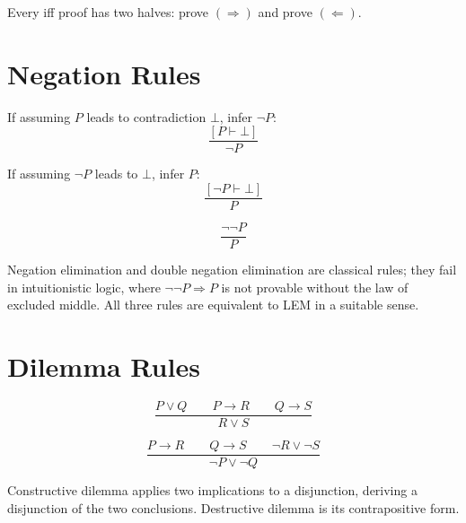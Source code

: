 \begin{remark} Every iff proof has two halves: prove $(\Rightarrow)$
and prove $(\Leftarrow)$.
\end{remark}

\section*{Negation Rules}

\begin{definition}\label{def:neg-i}
If assuming $P$ leads to contradiction $\bot$, infer $\neg P$:
\[
\frac{[P \vdash \bot]}{\neg P}
\]
\end{definition}

\begin{definition}\label{def:neg-e}
If assuming $\neg P$ leads to $\bot$, infer $P$:
\[
\frac{[\neg P \vdash \bot]}{P}
\]
\end{definition}

\begin{definition}\label{def:dne}
\[
\frac{\neg\neg P}{P}
\]
\end{definition}

\begin{remark}
Negation elimination and double negation elimination are classical rules;
they fail in intuitionistic logic, where $\neg\neg P \Rightarrow P$ is not
provable without the law of excluded middle. All three rules are equivalent
to LEM in a suitable sense.
\end{remark}

\section*{Dilemma Rules}

\begin{definition}\label{def:cd}
\[
\frac{P \vee Q \qquad P \rightarrow R \qquad Q \rightarrow S}{R \vee S}
\]
\end{definition}

\begin{definition}\label{def:dd}
\[
\frac{P \rightarrow R \qquad Q \rightarrow S \qquad \neg R \vee \neg S}{\neg P \vee \neg Q}
\]
\end{definition}

\begin{remark}[Intuition] Constructive dilemma applies two implications to a
disjunction, deriving a disjunction of the two conclusions. Destructive dilemma
is its contrapositive form.
\end{remark}
